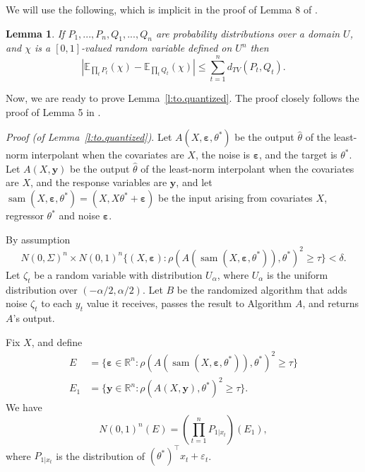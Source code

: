 \documentclass[11pt,notitlepage]{article}
\newcommand{\htheta}{\hat{\theta}}
\newcommand\E {\mathbb{E}}
\newcommand\R {\mathbb{R}}
\newcommand\bs {\boldsymbol}
\newcommand\sam {\ensuremath{\operatorname{\mathrm{sam}}}}
\newcommand\eps {\varepsilon}
\newtheorem{lemma}[theorem]{Lemma}
\begin{document}
We will use the following, which is implicit
in the proof of Lemma 8 of \cite{bartlett1992learning}.
\begin{lemma}
\label{l:product}
If $P_1,...,P_n, Q_1,...,Q_n$ are probability distributions over
a domain $U$, and $\chi$ is a $[0,1]$-valued random variable
defined on $U^n$ then
\[
\left| \E_{\prod_t P_t} (\chi) - \E_{\prod_t Q_t} (\chi) \right|
 \leq \sum_{t=1}^n d_{TV}(P_t,Q_t).
\]
\end{lemma}

\medskip

Now, we are ready to prove Lemma~\ref{l:to.quantized}.  The
proof closely follows the proof of Lemma 5 in \cite{bartlett1996fat}.

{\em Proof (of Lemma~\ref{l:to.quantized})}.
Let $A(X, \bs{\eps}, \theta^*)$ be the output $\htheta$ of
the least-norm interpolant when the covariates are $X$,
the noise is $\bs{\eps}$, and the target is $\theta^*$.  
Let $A(X, \bs{y})$ be the output $\htheta$ of
the least-norm interpolant when the covariates are $X$,
and the response variables are $\bs{y}$, and 
let $\sam(X,\bs{\eps},\theta^*) = (X, X \theta^* + \bs{\eps})$ be
the input arising from covariates $X$, regressor $\theta^*$ and
noise $\bs{\eps}$.  

By assumption
\[
N(0,\Sigma)^n \times N(0,1)^n
 \{ (X, \bs{\eps}) 
       :
     \rho( A(\sam(X, \bs{\eps}, \theta^*)), \theta^*)^2 \geq \tau \} < \delta.
\]
Let $\zeta_t$ be a random variable with distribution $U_{\alpha}$,
where $U_{\alpha}$ is the uniform distribution over $(-\alpha/2, \alpha/2)$.
Let $B$ be the randomized algorithm that adds noise 
$\zeta_t$ to each $y_t$ value it receives, passes the result to
Algorithm $A$, and returns $A$'s output.

Fix $X$, and define
\begin{align*}
E & = \{ \bs{\eps} \in \R^n: 
      \rho( A(\sam(X, \bs{\eps}, \theta^*)), \theta^*)^2 \ge \tau \} \\
E_1 & = \{ \bs{y} \in \R^n: 
      \rho( A(X,\bs{y}), \theta^*)^2 \ge \tau \}.
\end{align*}
We have
\[
N(0,1)^n (E) = \left( \prod_{t=1}^n P_{1|x_t} \right) (E_1),
\]
where $P_{1|x_t}$ is the distribution of $(\theta^*)^{\top} x_t + \eps_t$.
\end{document}
